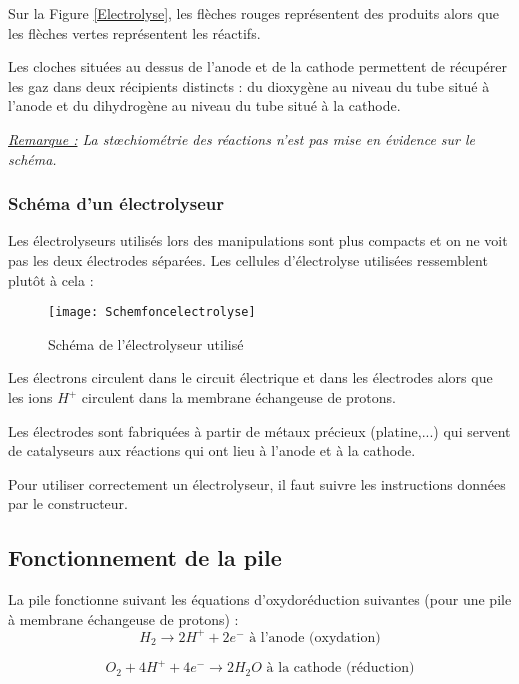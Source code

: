 \documentclass[a4paper, 11pt, twoside]{article}
\numberwithin{equation}{subsection}
\newcommand{\couleur}[1]{\ifbool{Couleur}{\color{#1}}{}}
\newcounter{th}\newcommand{\Thm}[2][]{\couleur{brown}\vspace{3ex}\boxput*(-0.4,1){\setlength{\fboxsep}{0pt}\colorbox{white}{\setlength{\fboxsep}{1ex}\Ovalbox{{\textsc{\ifstrequal{#1}{}{Théorème \stepcounter{th} \theth \phantom{}}{Théorème \stepcounter{th} \theth \phantom{} : #1}}}}}}{\setlength{\fboxsep}{7mm}\doublebox{\noindent \begin{minipage}{0.95\linewidth}\vspace{1ex}#2\end{minipage}}}\vspace{1ex}\couleur{black}}
\newcommand{\rem}[1]{\textit{\underline{Remarque :} #1}}
\begin{document}
	
	\newpage
	
	Sur la Figure \ref{Electrolyse}, les flèches rouges représentent des produits alors que les flèches vertes représentent les réactifs.
	
	Les cloches situées au dessus de l'anode et de la cathode permettent de récupérer les gaz dans deux récipients distincts : du dioxygène au niveau du tube situé à l'anode et du dihydrogène au niveau du tube situé à la cathode.
	
	\rem{La st\oe chiométrie des réactions n'est pas mise en évidence sur le schéma.}
	
	\subsubsection{Schéma d'un électrolyseur}
	
	Les électrolyseurs utilisés lors des manipulations sont plus compacts et on ne voit pas les deux électrodes séparées. Les cellules d'électrolyse utilisées ressemblent plutôt à cela :
	
	\begin{figure}[!h]
		\begin{center}
			\texttt{[image: Schemfoncelectrolyse]}
			\caption{Schéma de l'électrolyseur utilisé}
		\end{center}
	\end{figure}
	
	Les électrons circulent dans le circuit électrique et dans les électrodes alors que les ions $H^+$ circulent dans la membrane échangeuse de protons.
	
	Les électrodes sont fabriquées à partir de métaux précieux (platine,...) qui servent de catalyseurs aux réactions qui ont lieu à l'anode et à la cathode.
	
	Pour utiliser correctement un électrolyseur, il faut suivre les instructions données par le constructeur. 
	
	\subsection{Fonctionnement de la pile}
	
	La pile fonctionne suivant les équations d'oxydoréduction suivantes (pour une pile à membrane échangeuse de protons) :
	\begin{equation}\label{demi1}
		H_2 \rightarrow 2H^+ + 2e^- \textrm{ à l'anode (oxydation)}
	\end{equation}
	
	\begin{equation}\label{demi2}
		O_2 + 4H^+ + 4e^- \rightarrow 2H_2O	\textrm{ à la cathode (réduction)}
	\end{equation}
	
\end{document}
